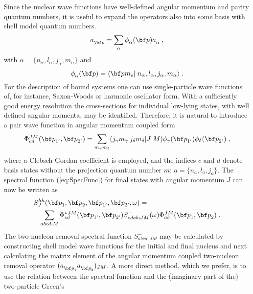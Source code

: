 Since the nuclear wave functions have well-defined angular momentum and 
parity quantum numbers, it is useful to expand the operators also into some 
basis with shell model quantum numbers.
%
	\begin{equation}
		\Oa{\rvec{p}}
	=
		\sum_{\alpha}
		\phi^{\phantom{\dagger}}_\alpha(\rvec{p})
		\Oa{\alpha}
	\label{eq:basisO}
	\;,
	\end{equation}
%
with $\alpha=\{n_\alpha, l_\alpha, j_\alpha, m_\alpha\}$ and
%
	\begin{equation}
		\phi^{\phantom{\dagger}}_\alpha(\rvec{p})
	=
		\inp< \rvec{p} m_s
		|n_\alpha, l_\alpha, j_\alpha, m_\alpha>
	\;.
	\end{equation}
%
 For
the description of bound systems one can use single-particle wave functions 
of, for instance, 
Saxon-Woods or harmonic oscillator form.
With a sufficiently good energy resolution the cross-sections for individual
low-lying 
states, with well defined angular momenta,  may be identified. Therefore, it is 
natural to introduce a pair wave function
in angular momentum coupled form\cite{Ed57,BG77,FW71}
%
	\begin{equation}
		\Phi^{JM}_{cd}( \rvec{p}_{1'}, \rvec{p}_{2'} )
	=
		\sum_{m_\gamma m_\delta}
		\CG( j_\gamma, m_\gamma, j_\delta, m_\delta, J, 
		\; M )
		\phi_\gamma( \rvec{p}_{1'})
		\phi_\delta( \rvec{p}_{2'})
	\label{eq:PhiCoup}
	\;,
	\end{equation}
%
where a Clebsch-Gordan coefficient is employed, and the indices $c$ and $d$ 
denote basis states without the projection quantum number $m$:
$a=\{n_a, l_a, j_a\}$. The spectral function (\ref{eq:SpecFunc}) for final 
states with angular momentum $J$ can now 
be written as
%
	\begin{eqnarray}
	\lefteqn{
		S^{hh}_J( \rvec{p}_1, \rvec{p}_2, \rvec{p}_{1'}, \rvec{p}_{2'}, 
		\omega )
	=}
	&&
	\label{eq:SpecFunc1} \\
	&&
		\sum_{abcd,M}
		\Phi^{\ast JM}_{cd}( \rvec{p}_{1'}, \rvec{p}_{2'} )
		S^-_{cdab;JM}(\omega)
		\Phi^{JM}_{ab}( \rvec{p}_1, \rvec{p}_2 )
	\nonumber
	\;.
	\end{eqnarray}
%
The two-nucleon removal spectral function $S^-_{abcd;JM}$ may be calculated by 
constructing shell model wave functions for the initial and final nucleus and 
next calculating the matrix element of the angular momentum coupled 
two-nucleon removal operator $(\Oa{\rvec{p}_1} \Oa{\rvec{p}_2})_{JM}$.
A more direct method, which we prefer, is to use the relation between
the spectral function and the (imaginary part of the) two-particle Green's 

